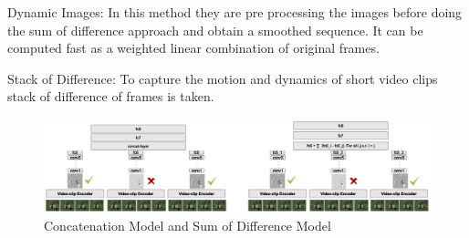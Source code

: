 Dynamic Images: In this method they are pre processing the images before doing the sum of difference approach and obtain a smoothed sequence.
It can be computed fast as a weighted linear combination of original frames.

Stack of Difference: To capture the motion and dynamics of short video clips stack of difference of frames is taken. 


\begin{figure}
\centering
\includegraphics[width=\textwidth]{images/o3n1.png}
\caption{Concatenation Model and Sum of Difference Model}
\label{fig:fusionmodel}
\end{figure}
